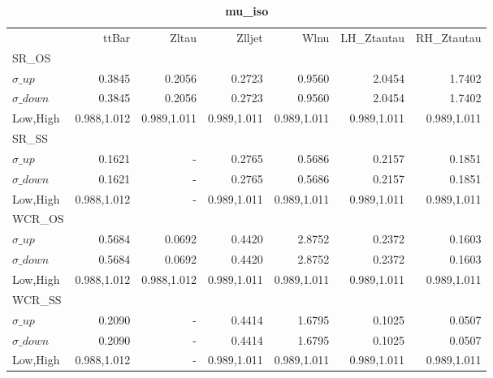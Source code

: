 \documentclass[11pt,oneside,a4paper]{article}
\begin{document}
\begin{table}
\caption{\bf{mu\_iso}}
\centering
\begin{tabular}{lrrrrrr}
& ttBar & Zltau & Zlljet & Wlnu & LH\_Ztautau & RH\_Ztautau \\

SR\_OS &  &  &  &  &  &  \\
$\sigma\_up$ & 0.3845 & 0.2056 & 0.2723 & 0.9560 & 2.0454 & 1.7402 \\
$\sigma\_down$ & 0.3845 & 0.2056 & 0.2723 & 0.9560 & 2.0454 & 1.7402 \\
Low,High & 0.988,1.012 & 0.989,1.011 & 0.989,1.011 & 0.989,1.011 & 0.989,1.011 & 0.989,1.011 \\

\hline
SR\_SS &  &  &  &  &  &  \\
$\sigma\_up$ & 0.1621 & - & 0.2765 & 0.5686 & 0.2157 & 0.1851 \\
$\sigma\_down$ & 0.1621 & - & 0.2765 & 0.5686 & 0.2157 & 0.1851 \\
Low,High & 0.988,1.012 & - & 0.989,1.011 & 0.989,1.011 & 0.989,1.011 & 0.989,1.011 \\

\hline
WCR\_OS &  &  &  &  &  &  \\
$\sigma\_up$ & 0.5684 & 0.0692 & 0.4420 & 2.8752 & 0.2372 & 0.1603 \\
$\sigma\_down$ & 0.5684 & 0.0692 & 0.4420 & 2.8752 & 0.2372 & 0.1603 \\
Low,High & 0.988,1.012 & 0.988,1.012 & 0.989,1.011 & 0.989,1.011 & 0.989,1.011 & 0.989,1.011 \\

\hline
WCR\_SS &  &  &  &  &  &  \\
$\sigma\_up$ & 0.2090 & - & 0.4414 & 1.6795 & 0.1025 & 0.0507 \\
$\sigma\_down$ & 0.2090 & - & 0.4414 & 1.6795 & 0.1025 & 0.0507 \\
Low,High & 0.988,1.012 & - & 0.989,1.011 & 0.989,1.011 & 0.989,1.011 & 0.989,1.011 \\

\end{tabular}
\end{table}
\end{document}
